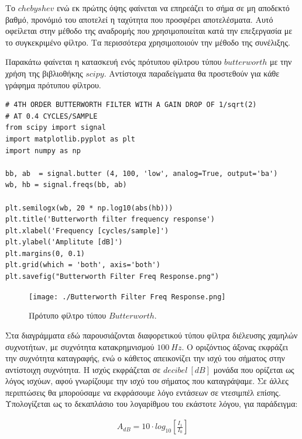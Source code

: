 \documentclass[breaklines=true, 12pt]{article}
\begin{document}
{{{Το \(chebyshev\) ενώ εκ πρώτης όψης φαίνεται να επηρεάζει το σήμα σε μη
αποδεκτό βαθμό, προνόμιό του αποτελεί η ταχύτητα που προσφέρει αποτελέσματα.
Αυτό οφείλεται στην μέθοδο της αναδρομής που χρησιμοποιείται κατά την επεξεργασία
με το συγκεκριμένο φίλτρο. Τα περισσότερα χρησιμοποιούν την μέθοδο της συνέλιξης.

Παρακάτω φαίνεται η κατασκευή ενός πρότυπου φίλτρου τύπου \(butterworth\) με την χρήση
της βιβλιοθήκης \(scipy\). Αντίστοιχα παραδείγματα θα προστεθούν για κάθε γράφημα
πρότυπου φίλτρου.

\begin{verbatim}
# 4TH ORDER BUTTERWORTH FILTER WITH A GAIN DROP OF 1/sqrt(2)
# AT 0.4 CYCLES/SAMPLE
from scipy import signal
import matplotlib.pyplot as plt
import numpy as np

bb, ab  = signal.butter (4, 100, 'low', analog=True, output='ba')
wb, hb = signal.freqs(bb, ab)

plt.semilogx(wb, 20 * np.log10(abs(hb)))
plt.title('Butterworth filter frequency response')
plt.xlabel('Frequency [cycles/sample]')
plt.ylabel('Amplitute [dB]')
plt.margins(0, 0.1)
plt.grid(which = 'both', axis='both')
plt.savefig("Butterworth Filter Freq Response.png")

\end{verbatim}

\begin{figure}[htbp]
\centering
\texttt{[image: ./Butterworth Filter Freq Response.png]}
\caption{Πρότυπο φίλτρο τύπου \(Butterworth\).}
\end{figure}

Στα διαγράμματα εδώ παρουσιάζονται διαφορετικού τύπου φίλτρα διέλευσης
χαμηλών συχνοτήτων, με συχνότητα κατακρημνισμού \(100\ Hz\). Ο οριζόντιος άξονας
εκφράζει την συχνότητα καταγραφής, ενώ ο κάθετος απεικονίζει την ισχύ του
σήματος στην αντίστοιχη συχνότητα. Η ισχύς εκφράζεται σε \(decibel\ [dB]\) μονάδα
που ορίζεται ως λόγος ισχύων, αφού γνωρίζουμε την ισχύ του σήματος που
καταγράψαμε. Σε άλλες περιπτώσεις θα μπορούσαμε να εκφράσουμε λόγο εντάσεων
σε ντεσιμπέλ επίσης. Υπολογίζεται ως το δεκαπλάσιο του λογαρίθμου του
εκάστοτε λόγου, για παράδειγμα:

\begin{equation}
\begin{align}
A_{dB} = 10 \cdot log_{10}\left[{\frac{I_{1}}{I_{0}}}\right]
\end{align}
\end{equation}

}}}
\end{document}
